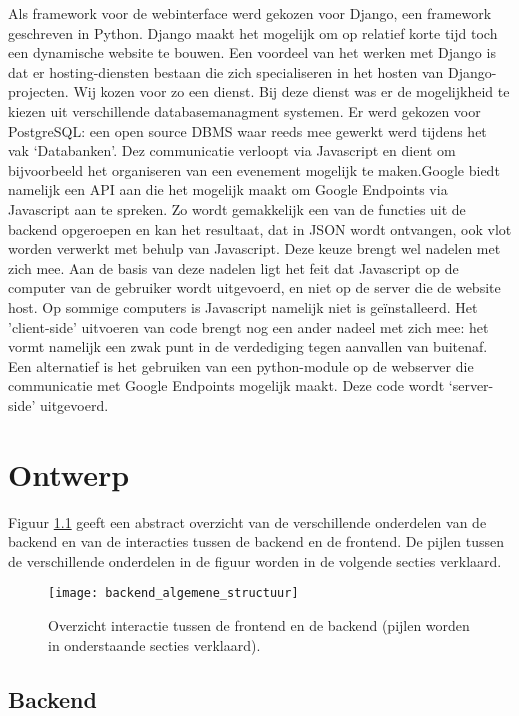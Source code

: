 Als framework voor de webinterface werd gekozen voor Django, een framework geschreven in Python. Django maakt het mogelijk om op relatief korte tijd toch een dynamische website te bouwen.
Een voordeel van het werken met Django is dat er hosting-diensten bestaan die zich specialiseren in het hosten van Django-projecten. Wij kozen voor zo een dienst\cite{djangoeurope}.
Bij deze dienst was er de mogelijkheid te kiezen uit verschillende databasemanagment systemen. Er werd gekozen voor PostgreSQL: een open source DBMS waar reeds mee gewerkt werd tijdens het vak `Databanken'.
Dez communicatie verloopt via Javascript en dient om bijvoorbeeld het organiseren van een evenement mogelijk te maken.Google biedt namelijk een API aan die het mogelijk maakt om Google Endpoints via Javascript aan te spreken. Zo wordt gemakkelijk een van de functies uit de backend opgeroepen en kan het resultaat, dat in JSON wordt ontvangen, ook vlot worden verwerkt met behulp van Javascript. Deze keuze brengt wel nadelen met zich mee. Aan de basis van deze nadelen ligt het feit dat Javascript op de computer van de gebruiker wordt uitgevoerd, en niet op de server die de website host. Op sommige computers is Javascript namelijk niet is geïnstalleerd. Het 'client-side' uitvoeren van code brengt nog een ander nadeel met zich mee: het vormt namelijk een zwak punt in de verdediging tegen aanvallen van buitenaf. Een alternatief is het gebruiken van een python-module op de webserver die communicatie met Google Endpoints mogelijk maakt. Deze code wordt `server-side' uitgevoerd.


\chapter{Ontwerp}
Figuur \ref{fig:algemene structuur backend} geeft een abstract overzicht van de verschillende onderdelen van de backend en van de interacties tussen de backend en de frontend. De pijlen tussen de verschillende onderdelen in de figuur worden in de volgende secties verklaard.

\begin{figure}[H]
	\centering
	\texttt{[image: backend\_algemene\_structuur]}
	\caption{Overzicht interactie tussen de frontend en de backend (pijlen worden in onderstaande secties verklaard).}
	\label{fig:algemene structuur backend}
	
\end{figure}
\section{Backend}
